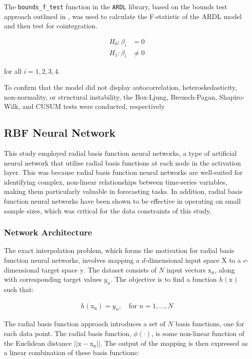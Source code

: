 \documentclass[11pt,a4paper]{article}
\newcommand{\citeboth}[1]{\citeauthor{#1} \citep{#1}}
\begin{document}
The \texttt{{bounds\_f\_test}} function in 
the \texttt{ARDL} library, based on the bounds test approach 
outlined in \citeboth{pesaran2001}, was used to calculate the 
F-statistic of the ARDL model and then test for cointegration.

\begin{align*}
    H_{0}: \beta_i &= 0\\
    H_{1}: \beta_i &\neq 0
\end{align*}

for all $i = 1,2,3,4$. 

To confirm that the model did not display autocorrelation, heteroskedasticity, {non-normality}, or structural instability, the Box-Ljung, Breusch-Pagan, Shapiro-Wilk, and CUSUM tests were conducted, respectively

\subsection{RBF Neural Network}

This study employed radial basis function neural networks, 
a type of artificial neural network that utilise radial basis functions 
at each node in the activation layer. 
This was because radial basis function neural networks 
are well-suited for identifying complex, non-linear relationships 
between time-series variables, making them particularly valuable in 
forecasting tasks. In addition, radial basis function neural networks
have been shown to be effective in operating on small sample sizes, 
which was critical for the data constraints of this study.


\subsubsection{Network Architecture}
The exact interpolation problem, which forms the motivation for radial basis function neural networks, 
involves mapping a $d$-dimensional input space $\boldsymbol{\mathrm{X}}$ to
a $c$-dimensional target space $\boldsymbol{\mathrm{y}}$. The dataset consists of $N$ input
vectors $\boldsymbol{\mathrm{x_n}}$, along with corresponding target 
values $y_n$. The objective is to find a function
  $h(\boldsymbol{\mathrm{x}})$ such that:


\begin{align}
  h(\boldsymbol{\mathrm{x_n}}) = y_n, \quad \text{for } n = 1, \ldots, N
\end{align}

The radial basis function approach 
introduces a set of $N$ basis functions, one for each 
data point. The radial basis function, $\phi(\cdot)$, is some non-linear function of the Euclidean distance
$||\boldsymbol{\mathrm{x}} - \boldsymbol{\mathrm{x_n}}||$. The output of the mapping is then expressed as a linear combination of these basis functions:
\end{document}
